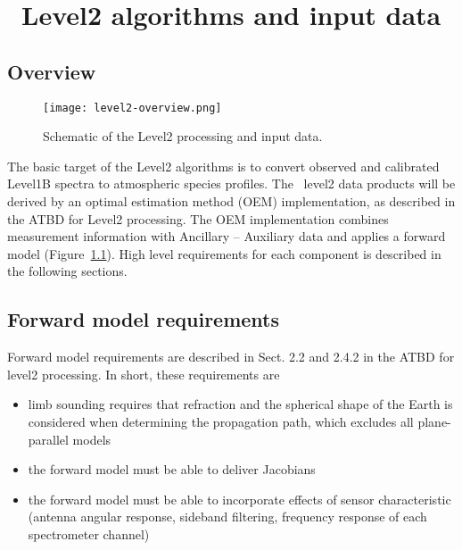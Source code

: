 \chapter{\smr\ Level2 algorithms and input data}
\section{Overview}

\begin{figure}[t]
\texttt{[image: level2-overview.png]}
\caption{Schematic of the Level2 processing and input data.}
\label{fig:level2}
\end{figure}


The basic target of the Level2 algorithms is to
convert observed and calibrated Level1B spectra
to atmospheric species profiles.
The \smr\ level2 data products will be derived by an
optimal estimation method (OEM) implementation, as described
in the ATBD for Level2 processing. 
The OEM implementation combines measurement information with 
Ancillary -- Auxiliary data and applies a forward 
model (Figure~\ref{fig:level2}). High level requirements for each 
component is described in the following sections.

\section{Forward model requirements}

Forward model requirements are described in Sect. 2.2
and 2.4.2 in the ATBD for level2 processing.
In short, these requirements are

\begin{itemize}


\item limb sounding requires that refraction and the spherical shape
of the Earth is considered when determining the propagation path,
which excludes all plane-parallel models 

\item the forward model must be able to deliver Jacobians

\item the forward model must be able to incorporate effects of
sensor characteristic (antenna angular response, sideband filtering,
frequency response of each spectrometer channel) 

\end{itemize}

